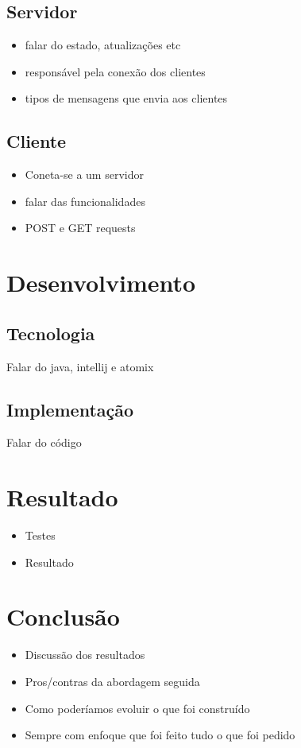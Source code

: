 \documentclass[12pt, a4paper]{report}
\begin{document}
\section{Servidor}
\begin{itemize}
    \item falar do estado, atualizações etc
    \item responsável pela conexão dos clientes
    \item tipos de mensagens que envia aos clientes
\end{itemize}

\section{Cliente}
\begin{itemize}
    \item Coneta-se a um servidor
    \item falar das funcionalidades
    \item POST e GET requests
\end{itemize}


\chapter{Desenvolvimento}
\section{Tecnologia}
Falar do java, intellij e atomix

\section{Implementação}
Falar do código

\chapter{Resultado}
\begin{itemize}
    \item Testes
    \item Resultado
\end{itemize}


\chapter{Conclusão}
\begin{itemize}
    \item Discussão dos resultados
    \item Pros/contras da abordagem seguida
    \item Como poderíamos evoluir o que foi construído
    \item Sempre com enfoque que foi feito tudo o que foi pedido
\end{itemize}
\end{document}
